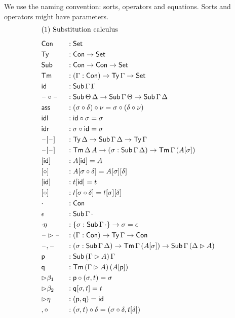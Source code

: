 \documentclass[a4paper,UKenglish,cleveref, autoref]{lipics-v2019}
\begin{document}
We use the naming convention: sorts, operators and equations. Sorts
and operators might have parameters.
\begin{alignat*}{5}
  & \rlap{(1) Substitution calculus} \\[0.5em]
  & \Con && : \Set \\
  & \Ty  && : \Con\ra\Set \\
  & \Sub  && : \Con\ra\Con\ra\Set \\
  & \Tm  && : (\Gamma:\Con)\ra\Ty\,\Gamma\ra\Set \\
  & \id && : \Sub\,\Gamma\,\Gamma \\
  & \blank\circ\blank && : \Sub\,\Theta\,\Delta\ra\Sub\,\Gamma\,\Theta\ra\Sub\,\Gamma\,\Delta \\
  & \ass && : (\sigma \circ \delta) \circ \nu = \sigma \circ (\delta \circ \nu) \\
  & \idl && : \id\circ\sigma = \sigma \\
  & \idr && : \sigma\circ\id = \sigma \\
  & \blank[\blank] && : \Ty\,\Delta\ra\Sub\,\Gamma\,\Delta\ra\Ty\,\Gamma \\
  & \blank[\blank] && : \Tm\,\Delta\,A\ra(\sigma:\Sub\,\Gamma\,\Delta)\ra\Tm\,\Gamma\,(A[\sigma]) \\
  & [\id] && : A[\id] = A \\
  & [\circ] && : A[\sigma \circ \delta] = A[\sigma][\delta] \\
  & [\id] && : t[\id] = t \\
  & [\circ] && : t[\sigma \circ \delta] = t[\sigma][\delta] \\
  & \cdot && : \Con \\
  & \epsilon && : \Sub\,\Gamma\,\cdot \\
  & {\cdot\eta} && : \{\sigma : \Sub\,\Gamma\,\cdot\} \ra \sigma = \epsilon \\
  & \blank\ext\blank && : (\Gamma:\Con)\ra\Ty\,\Gamma\ra\Con \\
  & \blank,\blank && : (\sigma:\Sub\,\Gamma\,\Delta)\ra\Tm\,\Gamma\,(A[\sigma])\ra\Sub\,\Gamma\,(\Delta\ext A) \\
  & \p && : \Sub\,(\Gamma\ext A)\,\Gamma \\
  & \q && : \Tm\,(\Gamma\ext A)\,(A[\p]) \\
  & {\ext\beta_1} && : \p\circ(\sigma, t) = \sigma \\
  & {\ext\beta_2} && : \q[\sigma, t] = t \\
  & {\ext\eta} && : (\p, \q) = \id \\
  & {,\circ} && : (\sigma, t)\circ\delta = (\sigma\circ\delta, t[\delta]) \\[0.5em]

\end{alignat*}
\end{document}
